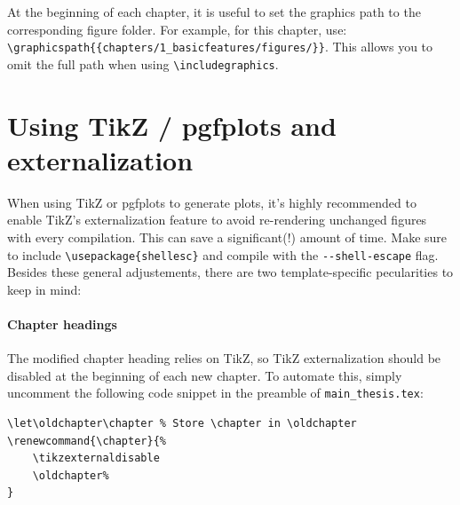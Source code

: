 At the beginning of each chapter, it is useful to set the graphics path to the corresponding figure folder. For example, for this chapter, use: \verb|\graphicspath{{chapters/1_basicfeatures/figures/}}|. This allows you to omit the full path when using \verb|\includegraphics|.


\section{Using TikZ / pgfplots and externalization}
When using TikZ or pgfplots to generate plots,  it’s highly recommended to enable TikZ's externalization feature to avoid re-rendering unchanged figures with every compilation. This can save a significant(!) amount of time.  
Make sure to include \verb|\usepackage{shellesc}| and compile with the \verb|--shell-escape| flag. Besides these general adjustements, there are two template-specific pecularities to keep in mind: 

\paragraph{Chapter headings} The modified chapter heading relies on TikZ, so TikZ externalization should be disabled at the beginning of each new chapter. To automate this, simply uncomment the following code snippet in the preamble of \verb|main_thesis.tex|:
\begin{lstlisting}
\let\oldchapter\chapter	% Store \chapter in \oldchapter
\renewcommand{\chapter}{%
	\tikzexternaldisable
	\oldchapter%
}
\end{lstlisting}
